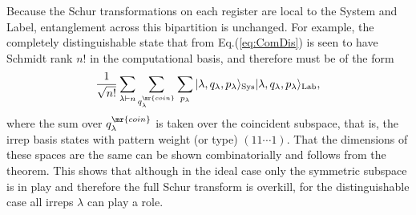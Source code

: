 Because the Schur transformations on each register are local to the System and Label, entanglement across this bipartition is unchanged.
For example, the completely distinguishable state that from Eq.(\ref{eq:ComDis}) is seen to have Schmidt rank $n!$ in the computational basis, and therefore must be of the form
\begin{equation}
\frac{1}{\sqrt{n!}} \sum_{\lambda \vdash n} \sum_{q_\lambda^\mr{coin}} \sum_{p_\lambda} |\lambda,q_\lambda,p_\lambda\rangle_{\textrm{Sys}}|\lambda,q_\lambda,p_\lambda\rangle_{\textrm{Lab}},
\end{equation}
where the sum over $q_\lambda^\mr{coin}$ is taken over the coincident subspace, that is, the irrep basis states with pattern weight (or type) $(11\cdots 1)$.
That the dimensions of these spaces are the same can be shown combinatorially and follows from the theorem.
This shows that although in the ideal case only the symmetric subspace is in play and therefore the full Schur transform is overkill, for the distinguishable case all irreps $\lambda$ can play a role.

